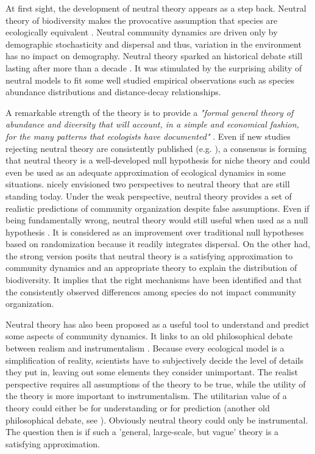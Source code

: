 \documentclass[12pt]{article}
\begin{document}
At first sight, the development of neutral theory appears as a step back.
Neutral theory of biodiversity makes the provocative assumption that species are
ecologically equivalent \parencite{Bell2000,Hubbell2001}. Neutral community
dynamics are driven only by demographic stochasticity and dispersal and thus,
variation in the environment has no impact on demography. Neutral theory sparked
an historical debate still lasting after more than a decade
\parencite{Chave2004, Etienne2011, Rosindell2012,Clark2012}. It was stimulated
by the surprising ability of neutral models to fit some well studied empirical
observations such as species abundance distributions and distance-decay
relationships.

A remarkable strength of the theory is to provide a \emph{"formal general theory
of abundance and diversity that will account, in a simple and economical
fashion, for the many patterns that ecologists have documented"}
\parencite{Bell2001}. Even if new studies rejecting neutral theory are
consistently published (e.g. \textcite{Ricklefs2012}), a consensus is forming
that neutral theory is a well-developed null hypothesis for niche theory and
could even be used as an adequate approximation of ecological dynamics in some
situations. \textcite{Bell2001} nicely envisioned two perspectives to neutral
theory that are still standing today. Under the weak perspective, neutral theory
provides a set of realistic predictions of community organization despite false
assumptions. Even if being fundamentally wrong, neutral theory would still
useful when used as a null hypothesis \parencite{Gotelli2006}. It is considered
as an improvement over traditional null hypotheses based on randomization
\parencite{Gotelli2000} because it readily integrates dispersal. On the other
had, the strong version posits that neutral theory is a satisfying approximation
to community dynamics and an appropriate theory to explain the distribution of
biodiversity. It implies that the right mechanisms have been identified and that
the consistently observed differences among species do not impact community
organization.

Neutral theory has also been proposed as a useful tool to understand and predict
some aspects of community dynamics. It links to an old philosophical debate
between realism and instrumentalism \parencite{Wennekes2012}. Because every
ecological model is a simplification of reality, scientists have to subjectively
decide the level of details they put in, leaving out some elements they consider
unimportant. The realist perspective requires all assumptions of the theory
to be true, while the utility of the theory is more important to
instrumentalism. The utilitarian value of a theory could either be for
understanding or for prediction (another old philosophical debate, see
\textcite{Shmueli2010}). Obviously neutral theory could only be instrumental.
The question then is if such a 'general, large-scale, but vague' theory
\parencite{Wennekes2012} is a satisfying approximation.
\end{document}
